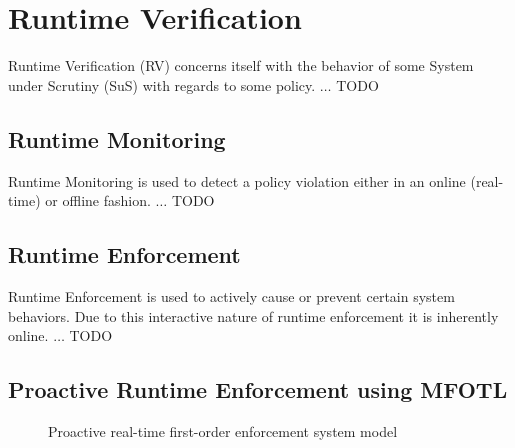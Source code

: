 \section{Runtime Verification}
\label{section:runtime-verification}
Runtime Verification (RV) concerns itself with the behavior of
some System under Scrutiny (SuS) with regards to some policy.
$\dots$ TODO

\subsection{Runtime Monitoring}
\label{subsection:runtime-monitoring}
Runtime Monitoring is used to detect a policy violation either in an
online (real-time) or offline fashion. $\dots$ TODO

\subsection{Runtime Enforcement}
\label{subsection:runtime-enforcement}
Runtime Enforcement is used to actively cause or prevent certain system behaviors.
Due to this interactive nature of runtime enforcement it is inherently online.
$\dots$ TODO

\subsection{Proactive Runtime Enforcement using MFOTL}
\label{subsection:proactive-runtime-enforcement}

\begin{figure}
    \begin{center}
    \end{center}
    \caption{Proactive real-time first-order enforcement system model}
    \label{fig:system-model}
\end{figure}

